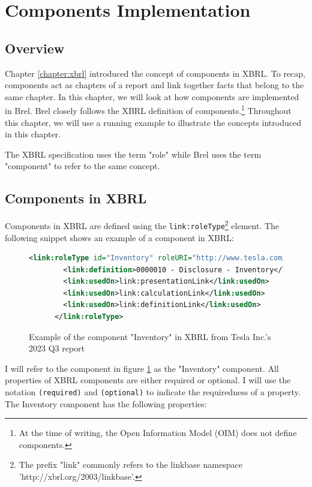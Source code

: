 \section{Components Implementation}

\subsection{Overview}

Chapter \ref{chapter:xbrl} introduced the concept of components in XBRL.
To recap, components act as chapters of a report and link together facts that belong to the same chapter.
In this chapter, we will look at how components are implemented in Brel.\cite{tesla_10q_2023_q3}
Brel closely follows the XBRL definition of components.\footnote[1]{At the time of writing, the Open Information Model (OIM) does not define components.}
Throughout this chapter, we will use a running example to illustrate the concepts introduced in this chapter.

The XBRL specification uses the term "role" while Brel uses the term "component" to refer to the same concept. 

\subsection{Components in XBRL}

Components in XBRL are defined using the \texttt{link:roleType}\footnote[2]{The prefix "link" commonly refers to the linkbase namespace 'http://xbrl.org/2003/linkbase'.} element. 
The following snippet shows an example of a component in XBRL:

\begin{figure}[H]
    \caption{Example of the component "Inventory" in XBRL from Tesla Inc.'s 2023 Q3 report\cite{tesla_10q_2023_q3}}
    \label{fig:example_component_xbrl}
    \begin{lstlisting}[language=XML,basicstyle=\fontsize{7}{10}\selectfont\ttfamily]
      <link:roleType id="Inventory" roleURI="http://www.tesla.com/role/Inventory">
        <link:definition>0000010 - Disclosure - Inventory</link:definition>
        <link:usedOn>link:presentationLink</link:usedOn>
        <link:usedOn>link:calculationLink</link:usedOn>
        <link:usedOn>link:definitionLink</link:usedOn>
      </link:roleType>
    \end{lstlisting}
\end{figure}

I will refer to the component in figure \ref{fig:example_component_xbrl} as the "Inventory" component.
All properties of XBRL components are either required or optional.
I will use the notation \texttt{(required)} and \texttt{(optional)} to indicate the requiredness of a property.
The Inventory component has the following properties:


